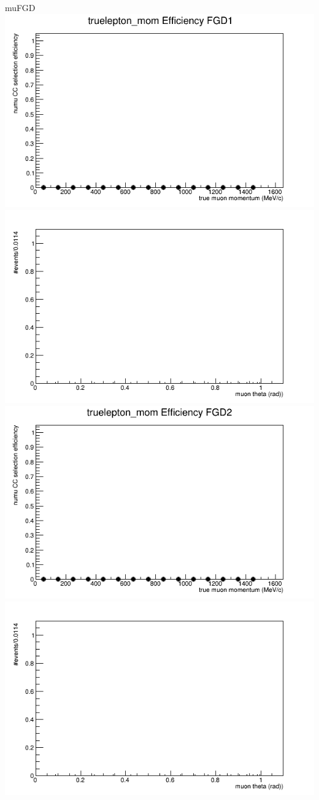 \documentclass{beamer}
\begin{document}
\begin{frame}{muFGD}
\center
\includegraphics[width=.45\textwidth]{images/Eff_truelepton_mom_topology_muFGD_accum_level[][0][49]_data_mc.png}
\includegraphics[width=.45\textwidth]{images/Eff_truelepton_costheta_topology_muFGD_accum_level[][0][49]_data_mc.png}
\includegraphics[width=.45\textwidth]{images/Eff_truelepton_mom_fgd2topology_muFGD_accum_level[][1][49]_data_mc.png}
\includegraphics[width=.45\textwidth]{images/Eff_truelepton_costheta_fgd2topology_muFGD_accum_level[][1][49]_data_mc.png}
\end{frame}
\end{document}
